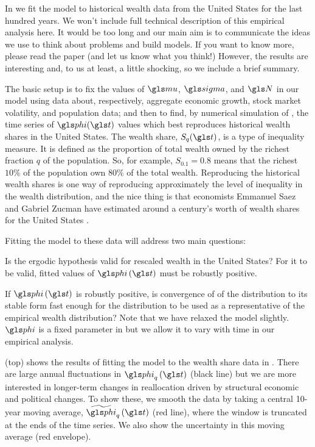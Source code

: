 In \cite{BermanPetersAdamou2017} we fit the \RGBM model to historical wealth data from the United States for the last hundred years. We won't include full technical description of this empirical analysis here. It would be too long and our main aim is to communicate the ideas we use to think about problems and build models. If you want to know more, please read the paper (and let us know what you think!) However, the results are interesting and, to us at least, a little shocking, so we include a brief summary.

The basic setup is to fix the values of $\gmu$, $\gsigma$, and $\N$ in our \RGBM model using data about, respectively, aggregate economic growth, stock market volatility, and population data; and then to find, by numerical simulation of , the time series of $\gphi(\t)$ values which best reproduces historical wealth shares in the United States. The wealth share, $S_q(\t)$, is a type of inequality measure. It is defined as the proportion of total wealth owned by the richest fraction $q$ of the population. So, for example, $S_{0.1}=0.8$ means that the richest $10\%$ of the population own $80\%$ of the total wealth. Reproducing the historical wealth shares is one way of reproducing approximately the level of inequality in the wealth distribution, and the nice thing is that economists Emmanuel Saez and Gabriel Zucman have estimated around a century's worth of wealth shares for the United States \cite{SaezZucman2014}.

Fitting the model to these data will address two main questions:
\bi
\item Is the ergodic hypothesis valid for rescaled wealth in the United States? For it to be valid, fitted values of $\gphi\left(\t\right)$ must be robustly positive.
\item If $\gphi\left(\t\right)$ is robustly positive, is convergence of of the distribution to its stable form fast enough for the distribution to be used as a representative of the empirical wealth distribution?
\ei
Note that we have relaxed the model slightly. $\gphi$ is a fixed parameter in  but we allow it to vary with time in our empirical analysis.

 (top) shows the results of fitting the \RGBM model to the wealth share data in \cite{SaezZucman2014}. There are large annual fluctuations in $\gphi_q\left(\t\right)$ (black line) but we are more interested in longer-term changes in reallocation driven by structural economic and political changes. To show these, we smooth the data by taking a central 10-year moving average, $\widetilde{\gphi}_q\left(\t\right)$ (red line), where the window is truncated at the ends of the time series. We also show the uncertainty in this moving average (red envelope).


